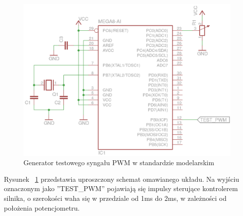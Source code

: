 \begin{figure}[H]
	\centering
	\includegraphics[scale=1]{Pictures/TestSignalGenerator.png}
	\caption[Generator testowego syngału PWM w standardzie modelarskim]{Generator testowego syngału PWM w standardzie modelarskim}
	\label{fig:TestSignalGenerator_sch}
\end{figure}

Rysunek ~\ref{fig:TestSignalGenerator_sch} przedstawia uproszczony schemat omawianego układu. Na wyjściu oznaczonym jako ''TEST\_PWM'' pojawiają się impulsy sterujące kontrolerem silnika, o szerokości waha się w przedziale od 1ms do 2ms, w zależności od położenia potencjometru.

